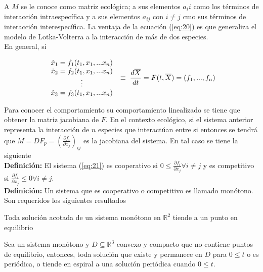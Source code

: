 \documentclass[10pt,oneside]{article}
\theoremstyle{definition}
\begin{document}
\begin{multicols}{2}
    A $M$ se le conoce como matriz ecológica; a sus elementos $a_ii$ como los términos de interacción intraespecífica y a sus elementos $a_{ij}$ con $i\neq j$ cmo sus términos de interacción interespecífica. La ventaja de la ecuación (\ref{eq:20}) es que generaliza el modelo de Lotka-Volterra a la interacción de más de dos especies. \\\newline  En general, si 

    \begin{equation}\label{eq:21}
    \begin{array}{c}
        \dot x_1 = f_1(t_1, x_1,...x_n)  \\
        \dot x_2 = f_2(t_1, x_1,...x_n)  \\
             \vdots  \\
        \dot x_3 = f_3(t_1, x_1,...x_n) 
    \end{array} \hspace{0.1cm}\equiv\hspace{0.1cm} \frac{d \overline{X}}{dt}=F(t,\overline{X})= (f_1,...,f_n)
    \end{equation}


    Para conocer el comportamiento su comportamiento linealizado se tiene que obtener la matriz jacobiana de $F$. En el contexto ecológico, si el sistema anterior representa la interacción de $n$ especies que interactúan entre si entonces se tendrá que $M=DF_p=(\frac{\partial f_i}{\partial x_j})_{ij}$ es la jacobiana del sistema. En tal caso se tiene la siguiente\\ \newline\textbf{Definición:} El sistema (\ref{eq:21}) es cooperativo si $0\leq\frac{\partial f_i}{\partial x_j} \forall i\neq j$  y es competitivo si $\frac{\partial f_i}{\partial x_j}\leq 0 \forall i\neq j$.\\ \newline\textbf{Definición:} Un sistema que es cooperativo o competitivo es llamado monótono. Son requeridos los siguientes resultados

    \begin{theorems}{}{}
       Toda solución acotada de un sistema monótono en $\mathbb{R}^2$ tiende a un punto en equilibrio
\end{theorems}
    
    \begin{theorems}{}{}
       Sea un sistema monótono y $D\subseteq\mathbb{R}^3$ convexo y compacto que no contiene puntos de equilibrio, entonces, toda solución que existe y permanece en $D$ para $0\leq t$ o es periódica, o tiende en espiral a una solución periódica cuando $0\leq t$.
    \end{theorems}


\end{multicols}
\end{document}
